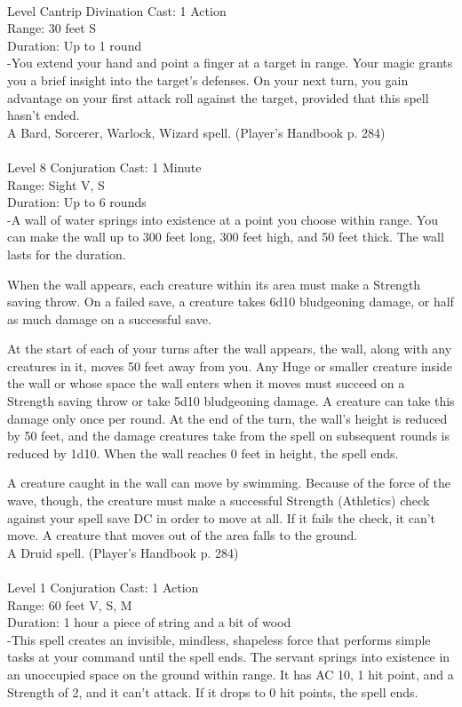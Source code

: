 \documentclass[10pt,twocolumn]{report}
\begin{document}
 \\
Level Cantrip \quad Divination \quad Cast: 1 Action\\
Range: 30 feet \quad S\\
Duration: Up to 1 round \quad \\
-You extend your hand and point a finger at a target in range. Your magic grants you a brief insight into the target’s defenses. On your next turn, you gain advantage on your first attack roll against the target, provided that this spell hasn’t ended.\\
A Bard, Sorcerer, Warlock, Wizard spell. (Player's Handbook p. 284) \\


 \\
Level 8 \quad Conjuration \quad Cast: 1 Minute\\
Range: Sight \quad V, S\\
Duration: Up to 6 rounds \quad \\
-A wall of water springs into existence at a point you choose within range. You can make the wall up to 300 feet long, 300 feet high, and 50 feet thick. The wall lasts for the duration.

When the wall appears, each creature within its area must make a Strength saving throw. On a failed save, a creature takes 6d10 bludgeoning damage, or half as much damage on a successful save.

At the start of each of your turns after the wall appears, the wall, along with any creatures in it, moves 50 feet away from you. Any Huge or smaller creature inside the wall or whose space the wall enters when it moves must succeed on a Strength saving throw or take 5d10 bludgeoning damage. A creature can take this damage only once per round. At the end of the turn, the wall’s height is reduced by 50 feet, and the damage creatures take from the spell on subsequent rounds is reduced by 1d10. When the wall reaches 0 feet in height, the spell ends.

A creature caught in the wall can move by swimming. Because of the force of the wave, though, the creature must make a successful Strength (Athletics) check against your spell save DC in order to move at all. If it fails the check, it can’t move. A creature that moves out of the area falls to the ground.\\
A Druid spell. (Player's Handbook p. 284) \\


 \\
Level 1 \quad Conjuration \quad Cast: 1 Action\\
Range: 60 feet \quad V, S, M\\
Duration: 1 hour \quad a piece of string and a bit of wood\\
-This spell creates an invisible, mindless, shapeless force that performs simple tasks at your command until the spell ends. The servant springs into existence in an unoccupied space on the ground within range. It has AC 10, 1 hit point, and a Strength of 2, and it can’t attack. If it drops to 0 hit points, the spell ends.
\end{document}
